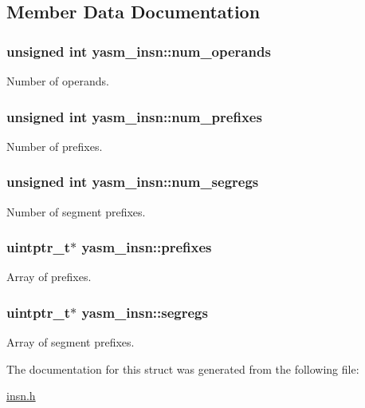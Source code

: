 \subsection{Member Data Documentation}
\hypertarget{structyasm__insn_a9ac9742d8c980c7e09ed6e2a7be54d68}{
\subsubsection[{num\-\_\-operands}]{\setlength{\rightskip}{0pt plus 5cm}unsigned int yasm\-\_\-insn\-::num\-\_\-operands}}\label{structyasm__insn_a9ac9742d8c980c7e09ed6e2a7be54d68}
Number of operands. \hypertarget{structyasm__insn_a197439fed907e61b04a9f154cfa64379}{
\subsubsection[{num\-\_\-prefixes}]{\setlength{\rightskip}{0pt plus 5cm}unsigned int yasm\-\_\-insn\-::num\-\_\-prefixes}}\label{structyasm__insn_a197439fed907e61b04a9f154cfa64379}
Number of prefixes. \hypertarget{structyasm__insn_a453de6522b676b79e5259a3d931eb786}{
\subsubsection[{num\-\_\-segregs}]{\setlength{\rightskip}{0pt plus 5cm}unsigned int yasm\-\_\-insn\-::num\-\_\-segregs}}\label{structyasm__insn_a453de6522b676b79e5259a3d931eb786}
Number of segment prefixes. \hypertarget{structyasm__insn_a948dae24d2851a148b09df5dab8738ae}{
\subsubsection[{prefixes}]{\setlength{\rightskip}{0pt plus 5cm}uintptr\-\_\-t$\ast$ yasm\-\_\-insn\-::prefixes}}\label{structyasm__insn_a948dae24d2851a148b09df5dab8738ae}
Array of prefixes. \hypertarget{structyasm__insn_ab06d761894e4d0684c85388e574f9ce6}{
\subsubsection[{segregs}]{\setlength{\rightskip}{0pt plus 5cm}uintptr\-\_\-t$\ast$ yasm\-\_\-insn\-::segregs}}\label{structyasm__insn_ab06d761894e4d0684c85388e574f9ce6}
Array of segment prefixes. 

The documentation for this struct was generated from the following file\-:\begin{DoxyCompactItemize}
\item 
\hyperlink{insn_8h}{insn.\-h}\end{DoxyCompactItemize}
